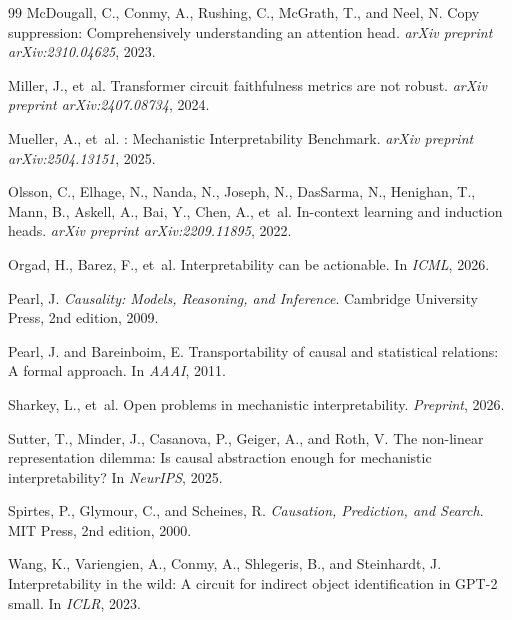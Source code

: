 \documentclass[10pt]{article}
\begin{document}
\begin{thebibliography}{99}
McDougall, C., Conmy, A., Rushing, C., McGrath, T., and Neel, N.
\newblock Copy suppression: Comprehensively understanding an attention head.
\newblock \emph{arXiv preprint arXiv:2310.04625}, 2023.

Miller, J., et~al.
\newblock Transformer circuit faithfulness metrics are not robust.
\newblock \emph{arXiv preprint arXiv:2407.08734}, 2024.

Mueller, A., et~al.
: Mechanistic Interpretability Benchmark.
\newblock \emph{arXiv preprint arXiv:2504.13151}, 2025.

Olsson, C., Elhage, N., Nanda, N., Joseph, N., DasSarma, N., Henighan, T., Mann, B., Askell, A., Bai, Y., Chen, A., et~al.
\newblock In-context learning and induction heads.
\newblock \emph{arXiv preprint arXiv:2209.11895}, 2022.

Orgad, H., Barez, F., et~al.
\newblock Interpretability can be actionable.
\newblock In \emph{ICML}, 2026.

Pearl, J.
\newblock \emph{Causality: Models, Reasoning, and Inference}.
\newblock Cambridge University Press, 2nd edition, 2009.

Pearl, J. and Bareinboim, E.
\newblock Transportability of causal and statistical relations: A formal approach.
\newblock In \emph{AAAI}, 2011.

Sharkey, L., et~al.
\newblock Open problems in mechanistic interpretability.
\newblock \emph{Preprint}, 2026.

Sutter, T., Minder, J., Casanova, P., Geiger, A., and Roth, V.
\newblock The non-linear representation dilemma: Is causal abstraction enough for mechanistic interpretability?
\newblock In \emph{NeurIPS}, 2025.

Spirtes, P., Glymour, C., and Scheines, R.
\newblock \emph{Causation, Prediction, and Search}.
\newblock MIT Press, 2nd edition, 2000.

Wang, K., Variengien, A., Conmy, A., Shlegeris, B., and Steinhardt, J.
\newblock Interpretability in the wild: A circuit for indirect object identification in {GPT}-2 small.
\newblock In \emph{ICLR}, 2023.


\end{thebibliography}
\end{document}
